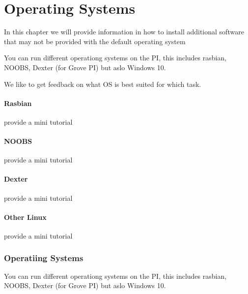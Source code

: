 \chapter{Operating Systems}

In this chapter we will provide information in how to install additional software that may not be provided with the default operating system

You can run different operationg systems on the PI, this includes 
rasbian, NOOBS, Dexter (for Grove PI) but aslo Windows 10.

We like to get feedback on what OS is best suited for which task.

\subsubsection{Rasbian}

\begin{exercise}
provide a mini tutorial 
\end{exercise}

\subsubsection{NOOBS}

\begin{exercise}
provide a mini tutorial 
\end{exercise}

\subsubsection{Dexter}

\begin{exercise}
provide a mini tutorial 
\end{exercise}

\subsubsection{Other Linux}

\begin{exercise}
provide a mini tutorial 
\end{exercise}

\subsection{Operatiing Systems}

You can run different operationg systems on the PI, this includes 
rasbian, NOOBS, Dexter (for Grove PI) but aslo Windows 10.


